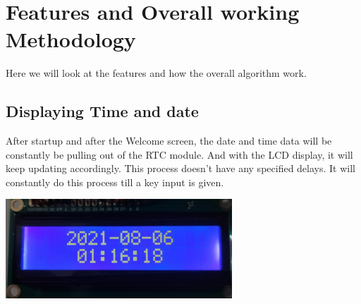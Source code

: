 \begin{minipage}{0.97\textwidth}
 \noindent{}\hfill
\end{minipage}

\newpage
\section{Features and Overall working Methodology}
Here we will look at the features and how the overall algorithm work.
\vspace{5mm}
\subsection{Displaying Time and date}

After startup and after the Welcome screen, the date and time data will be constantly be pulling out of the RTC module. And with the LCD display, it will keep updating accordingly. This process doesn’t have any specified delays. It will constantly do this process till a key input is given.

\begin{center}
  \includegraphics[width=8.5cm]{LCD Images/LCD 1.jpg}
\end{center}

